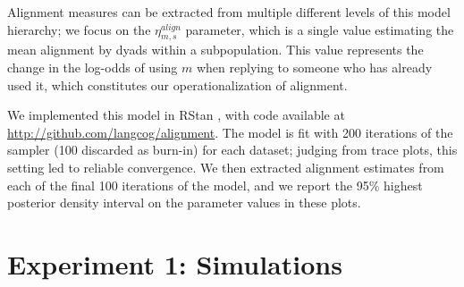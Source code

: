 \documentclass{acm_proc_article-sp}
\begin{document}
Alignment measures can be extracted from multiple different levels of this model hierarchy; we focus on the $\eta^{align}_{m,s}$ parameter, which is a single value estimating the mean alignment by dyads within a subpopulation. This value represents the change in the log-odds of using $m$ when replying to someone who has already used it, which constitutes our operationalization of alignment.

We implemented this model in RStan \cite{Stan}, with code available at \url{http://github.com/langcog/alignment}. The model is fit with 200 iterations of the sampler (100 discarded as burn-in) for each dataset; judging from trace plots, this setting led to reliable convergence.  We then extracted alignment estimates from each of the final 100 iterations of the model, and we report the 95\% highest posterior density interval on the parameter values in these plots.



\section{Experiment 1: Simulations}
\label{sec:simulations}
\end{document}
